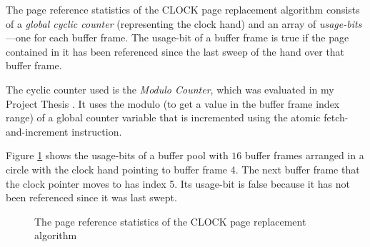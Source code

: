     The page reference statistics of the CLOCK page replacement algorithm consists of a \emph{global cyclic counter} (representing the clock hand) and an array of \emph{usage-bits}---one for each buffer frame. The usage-bit of a buffer frame is true if the page contained in it has been referenced since the last sweep of the hand over that buffer frame.

    The cyclic counter used is the \emph{Modulo Counter}, which was evaluated in my Project Thesis \cite{Gilbert:2020}. It uses the modulo (to get a value in the buffer frame index range) of a global counter variable that is incremented using the atomic fetch-and-increment instruction.

    Figure \ref{fig:clock} shows the usage-bits of a buffer pool with $16$ buffer frames arranged in a circle with the clock hand pointing to buffer frame 4. The next buffer frame that the clock pointer moves to has index 5. Its usage-bit is false because it has not been referenced since it was last swept.

\begin{@empty}
    
    \begin{figure}[h]
        \centering
        \vspace{.75em}
        \caption[Page reference statistics of CLOCK]{The page reference statistics of the CLOCK page replacement algorithm}
        \label{fig:clock}
    \end{figure}
\end{@empty}

